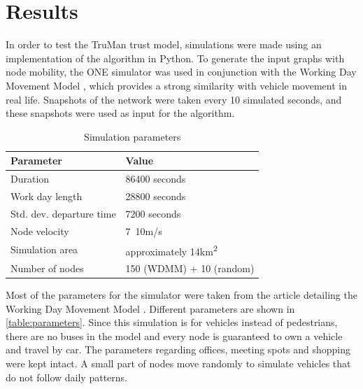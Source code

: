 \documentclass[conference]{IEEEtran}
\begin{document}
\section{Results}
\label{section:results}

In order to test the TruMan trust model, simulations were made using an implementation of the algorithm in Python.
To generate the input graphs with node mobility, the ONE simulator \cite{keranen2009one} was used in conjunction with the Working Day Movement Model \cite{ekman2008working}, which provides a strong similarity with vehicle movement in real life.
Snapshots of the network were taken every 10 simulated seconds, and these snapshots were used as input for the algorithm.

\begin{table}[h!]
\caption{Simulation parameters}
\label{table:parameters}
\centering
\begin{tabular}{|p{3cm}||p{3.5cm}|}
 \hline
 \textbf{Parameter}	& \textbf{Value} \\
 \hline
 \hline
 Duration 			& 86400 seconds \\
 \hline
 Work day length 	& 28800 seconds \\
 \hline
 Std. dev. departure time & 7200 seconds \\
 \hline
 Node velocity 		& 7~10m/s \\
 \hline
 Simulation area	& approximately 14km\textsuperscript{2} \\
 \hline
 Number of nodes 	& 150 (WDMM) + 10 (random) \\
 \hline
\end{tabular}
\end{table}

Most of the parameters for the simulator were taken from the article detailing the Working Day Movement Model \cite{ekman2008working}.
Different parameters are shown in \autoref{table:parameters}.
Since this simulation is for vehicles instead of pedestrians, there are no buses in the model and every node is guaranteed to own a vehicle and travel by car.
The parameters regarding offices, meeting spots and shopping were kept intact.
A small part of nodes move randomly to simulate vehicles that do not follow daily patterns.
\end{document}
